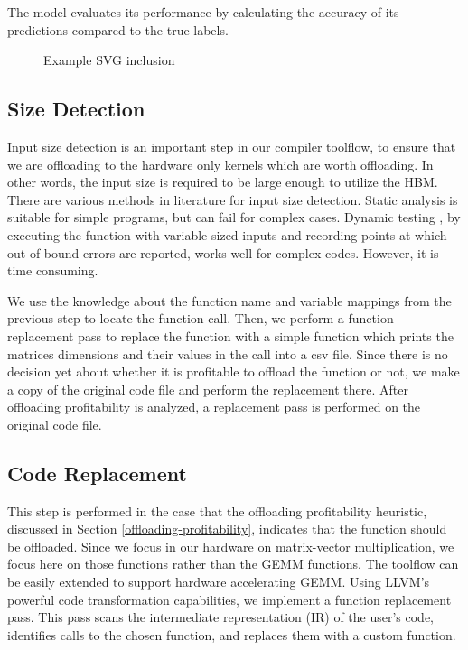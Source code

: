 \documentclass[manuscript,screen,review]{acmart}
\begin{document}
The model evaluates its performance by calculating the accuracy of its predictions compared to the true labels.



\begin{figure}[h]
	\centering
	
	\caption{Example SVG inclusion}
	\label{fig:decision-tree}
\end{figure}


\subsection{Size Detection}
Input size detection is an important step in our compiler toolflow, to ensure that we are offloading to the hardware only kernels which are worth offloading. In other words, the input size is required to be large enough to utilize the HBM. There are various methods in literature for input size detection. Static analysis \cite{static} is suitable for simple programs, but can fail for complex cases. Dynamic testing \cite{ATC}, by executing the function with variable sized inputs and recording points at which out-of-bound errors are reported, works well for complex codes. However, it is time consuming.

We use the knowledge about the function name and variable mappings from the previous step to locate the function call. Then, we perform a function replacement pass to replace the function with a simple function which prints the matrices dimensions and their values in the call into a csv file. Since there is no decision yet about whether it is profitable to offload the function or not, we make a copy of the original code file and perform the replacement there. After offloading profitability is analyzed, a replacement pass is performed on the original code file.

\subsection{Code Replacement}

This step is performed in the case that the offloading profitability heuristic, discussed in Section \ref{offloading-profitability}, indicates that the function should be offloaded. Since we focus in our hardware on matrix-vector multiplication, we focus here on those functions rather than the GEMM functions. The toolflow can be easily extended to support hardware accelerating GEMM. Using LLVM’s powerful code transformation capabilities, we implement a function replacement pass. This pass scans the intermediate representation (IR) of the user’s code, identifies calls to the chosen function, and replaces them with a custom function. 
\end{document}
